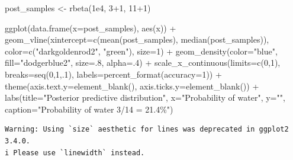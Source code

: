 \documentclass[
  letterpaper,
  DIV=11,
  numbers=noendperiod,
  oneside]{scrartcl}
\newenvironment{Shaded}{\begin{snugshade}}{\end{snugshade}}
\newcommand{\AttributeTok}[1]{\textcolor[rgb]{0.40,0.45,0.13}{#1}}
\newcommand{\DecValTok}[1]{\textcolor[rgb]{0.68,0.00,0.00}{#1}}
\newcommand{\FloatTok}[1]{\textcolor[rgb]{0.68,0.00,0.00}{#1}}
\newcommand{\FunctionTok}[1]{\textcolor[rgb]{0.28,0.35,0.67}{#1}}
\newcommand{\NormalTok}[1]{\textcolor[rgb]{0.00,0.23,0.31}{#1}}
\newcommand{\OtherTok}[1]{\textcolor[rgb]{0.00,0.23,0.31}{#1}}
\newcommand{\SpecialCharTok}[1]{\textcolor[rgb]{0.37,0.37,0.37}{#1}}
\newcommand{\StringTok}[1]{\textcolor[rgb]{0.13,0.47,0.30}{#1}}
\begin{document}
\begin{Shaded}
\begin{Highlighting}[]
\NormalTok{post\_samples }\OtherTok{\textless{}{-}} \FunctionTok{rbeta}\NormalTok{(}\FloatTok{1e4}\NormalTok{, }\DecValTok{3}\SpecialCharTok{+}\DecValTok{1}\NormalTok{, }\DecValTok{11}\SpecialCharTok{+}\DecValTok{1}\NormalTok{)}

\FunctionTok{ggplot}\NormalTok{(}\FunctionTok{data.frame}\NormalTok{(}\AttributeTok{x=}\NormalTok{post\_samples), }\FunctionTok{aes}\NormalTok{(x)) }\SpecialCharTok{+} 
  \FunctionTok{geom\_vline}\NormalTok{(}\AttributeTok{xintercept=}\FunctionTok{c}\NormalTok{(}\FunctionTok{mean}\NormalTok{(post\_samples), }\FunctionTok{median}\NormalTok{(post\_samples)), }\AttributeTok{color=}\FunctionTok{c}\NormalTok{(}\StringTok{"darkgoldenrod2"}\NormalTok{, }\StringTok{"green"}\NormalTok{),}
             \AttributeTok{size=}\DecValTok{1}\NormalTok{) }\SpecialCharTok{+}
  \FunctionTok{geom\_density}\NormalTok{(}\AttributeTok{color=}\StringTok{"blue"}\NormalTok{,}
               \AttributeTok{fill=}\StringTok{"dodgerblue2"}\NormalTok{,}
               \AttributeTok{size=}\NormalTok{.}\DecValTok{8}\NormalTok{,}
               \AttributeTok{alpha=}\NormalTok{.}\DecValTok{4}\NormalTok{) }\SpecialCharTok{+}
  \FunctionTok{scale\_x\_continuous}\NormalTok{(}\AttributeTok{limits=}\FunctionTok{c}\NormalTok{(}\DecValTok{0}\NormalTok{,}\DecValTok{1}\NormalTok{),}
                     \AttributeTok{breaks=}\FunctionTok{seq}\NormalTok{(}\DecValTok{0}\NormalTok{,}\DecValTok{1}\NormalTok{,.}\DecValTok{1}\NormalTok{),}
                     \AttributeTok{labels=}\FunctionTok{percent\_format}\NormalTok{(}\AttributeTok{accuracy=}\DecValTok{1}\NormalTok{)) }\SpecialCharTok{+}
  \FunctionTok{theme}\NormalTok{(}\AttributeTok{axis.text.y=}\FunctionTok{element\_blank}\NormalTok{(),}
        \AttributeTok{axis.ticks.y=}\FunctionTok{element\_blank}\NormalTok{()) }\SpecialCharTok{+}
  \FunctionTok{labs}\NormalTok{(}\AttributeTok{title=}\StringTok{"Posterior predictive distribution"}\NormalTok{,}
       \AttributeTok{x=}\StringTok{"Probability of water"}\NormalTok{,}
       \AttributeTok{y=}\StringTok{""}\NormalTok{,}
       \AttributeTok{caption=}\StringTok{"Probability of water 3/14 = 21.4\%"}\NormalTok{)}
\end{Highlighting}
\end{Shaded}

\begin{verbatim}
Warning: Using `size` aesthetic for lines was deprecated in ggplot2 3.4.0.
i Please use `linewidth` instead.
\end{verbatim}
\end{document}
